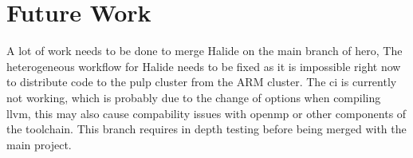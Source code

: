 \section{Future Work}
A lot of work needs to be done to merge Halide on the main branch of \gls{hero}, The heterogeneous workflow for Halide needs to be fixed as it is  impossible right now to distribute code to the \gls{pulp} cluster from the ARM cluster. 
The \gls{ci} is currently not working, which is probably due to the change of options when compiling \gls{llvm}, this may also cause compability issues with \gls{openmp} or other components of the toolchain. This branch requires in depth testing before being merged with the main project.




